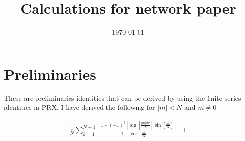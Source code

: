 \documentclass[idelinks, superscriptaddress, amsmath, amssymb, aps, pre]{revtex4-2}
\newif\ifmainText
\begin{document}
\title{Calculations for network paper}


\date{\today}%

\begin{abstract}
\end{abstract}


\maketitle

% 
% 

\ifmainText\mainTexttrue

\section*{Preliminaries}\label{sec:intro}


These are preliminaries identities that can be derived by using the finite series identities in PRX. I have derived the following for $|m|<N$ and $m\not=0$

\begin{align}
\frac{1}{N}\sum_{k=1}^{N-1}\frac{\left[1-(-1)^k\right]\sin\left[\frac{|m|\pi k}{N}\right]\sin\left[\frac{\pi k}{N}\right]}{1-\cos\left[\frac{\pi k}{N}\right]}=1
\label{eq:id_1}
\end{align}
\end{document}

